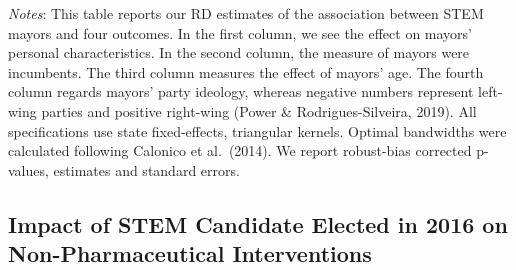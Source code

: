 \documentclass[
  letterpaper,
  DIV=11,
  numbers=noendperiod]{scrartcl}
\begin{document}
\emph{Notes}: This table reports our RD estimates of the association
between STEM mayors and four outcomes. In the first column, we see the
effect on mayors' personal characteristics. In the second column, the
measure of mayors were incumbents. The third column measures the effect
of mayors' age. The fourth column regards mayors' party ideology,
whereas negative numbers represent left-wing parties and positive
right-wing (Power \& Rodrigues-Silveira, 2019). All specifications use
state fixed-effects, triangular kernels. Optimal bandwidths were
calculated following Calonico et al.~(2014). We report robust-bias
corrected p-values, estimates and standard errors.

\subsection{Impact of STEM Candidate Elected in 2016 on
Non-Pharmaceutical
Interventions}\label{impact-of-stem-candidate-elected-in-2016-on-non-pharmaceutical-interventions}
\end{document}
